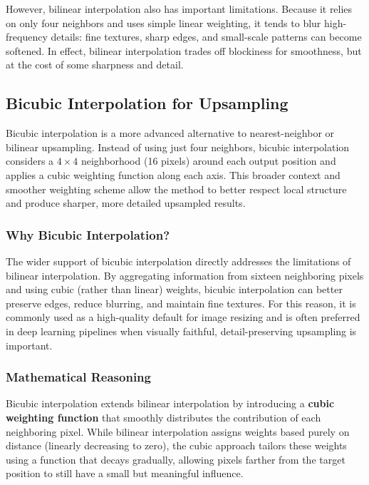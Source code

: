 However, bilinear interpolation also has important limitations. Because it relies on only four neighbors and uses simple linear weighting, it tends to blur high-frequency details: fine textures, sharp edges, and small-scale patterns can become softened. In effect, bilinear interpolation trades off blockiness for smoothness, but at the cost of some sharpness and detail.

\subsection{Bicubic Interpolation for Upsampling}
\noindent
Bicubic interpolation is a more advanced alternative to nearest-neighbor or bilinear upsampling. Instead of using just four neighbors, bicubic interpolation considers a \(4 \times 4\) neighborhood (16 pixels) around each output position and applies a cubic weighting function along each axis. This broader context and smoother weighting scheme allow the method to better respect local structure and produce sharper, more detailed upsampled results.

\subsubsection{Why Bicubic Interpolation?}
\noindent
The wider support of bicubic interpolation directly addresses the limitations of bilinear interpolation. By aggregating information from sixteen neighboring pixels and using cubic (rather than linear) weights, bicubic interpolation can better preserve edges, reduce blurring, and maintain fine textures. For this reason, it is commonly used as a high-quality default for image resizing and is often preferred in deep learning pipelines when visually faithful, detail-preserving upsampling is important.

\subsubsection{Mathematical Reasoning}

\noindent Bicubic interpolation extends bilinear interpolation by introducing a \textbf{cubic weighting function} that smoothly distributes the contribution of each neighboring pixel. While bilinear interpolation assigns weights based purely on distance (linearly decreasing to zero), the cubic approach tailors these weights using a function that decays gradually, allowing pixels farther from the target position to still have a small but meaningful influence.

